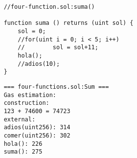         \noindent
    \begin{minipage}[t]{.5\linewidth}
    \begin{lstlisting}
    //four-function.sol:suma()
        
    function suma () returns (uint sol) {
        sol = 0;
        //for(uint i = 0; i < 5; i++)
        //        sol = sol+11;
        hola();
        //adios(10);
    }
    \end{lstlisting}
    \end{minipage}
    \begin{minipage}[t]{.5\linewidth}
    \begin{lstlisting}
    === four-functions.sol:Sum ===
    Gas estimation:
    construction:
    123 + 74600 = 74723
    external:
    adios(uint256):	314
    comer(uint256):	302
    hola():	226
    suma():	275
    \end{lstlisting}
    \end{minipage}

